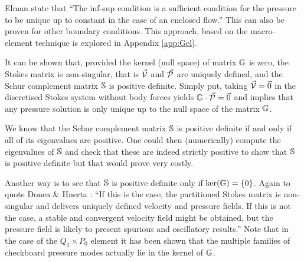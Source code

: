 Elman \etal \cite{elsw} state that ``The inf-sup condition is a sufficient condition 
for the pressure to be unique up to constant in the case of an enclosed flow.''
This can also be proven for other boundary conditions.
This approach, based on the macro-element technique \cite{sten90} is explored in Appendix \ref{app:Gel}.

It can be shown that, provided the kernel (null space) of matrix ${\mathbb{G}}$ is zero,
the Stokes matrix is non-singular, that is $\vec{\cal V}$ and $\vec{\cal P}$ 
are uniquely defined, and the Schur complement matrix ${\mathbb{S}}$ is positive definite. 
Simply put, taking $\vec{\cal V}=\vec{0}$ in the discretised Stokes system 
without body forces yields ${\mathbb{G}} \cdot \vec{\cal P}=\vec{0}$ and implies
that any pressure solution is only unique up to the null space of the matrix ${\mathbb{G}}$.

We know that the Schur complement matrix ${\mathbb{S}}$ is positive definite if and only if all of its eigenvalues are positive.
One could then (numerically) compute the eigenvalues of ${\mathbb{S}}$ and check that these are indeed strictly positive
to show that ${\mathbb{S}}$ is positive definite but that would prove very costly. 

Another way is to see that ${\mathbb{S}}$ is positive definite only if $\text{ker}({\mathbb{G}})=\{0\}$.
Again to quote Donea \& Huerta \cite{dohu03}: ``If this is the case, the partitioned Stokes matrix  
is non-singular and delivers uniquely defined velocity and pressure fields. If this is not the case, a
stable and convergent velocity field might be obtained, but the pressure field is likely
to present spurious and oscillatory results.'' 
Note that in the case of the $Q_1 \times P_0$ element it has been shown that the multiple families of 
checkboard pressure modes actually lie in the kernel of ${\mathbb{G}}$. \cite{sagl81a,sagl81b}

\hspace{.4cm}

